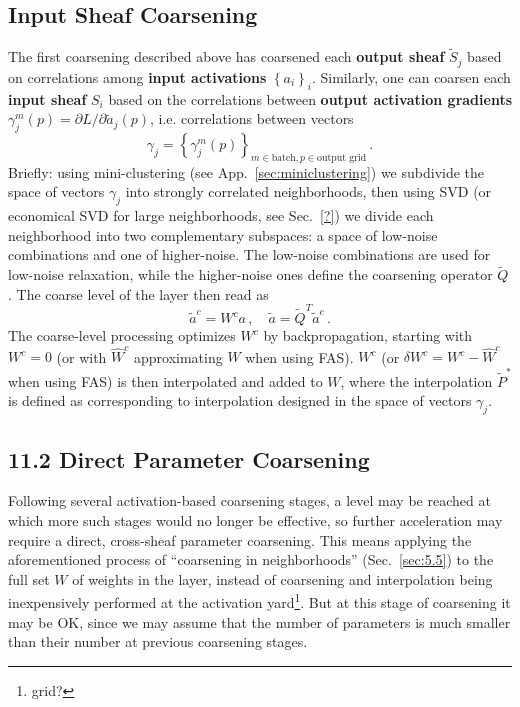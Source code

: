 \documentclass{article} %
\begin{document}
\subsection{Input Sheaf Coarsening}
The first coarsening described above has coarsened each \textbf{output sheaf} $\tilde{S}_j$ based on correlations among \textbf{input activations} $\left\{a_i\right\}_i$. Similarly, one can coarsen each \textbf{input sheaf} $S_i$ based on the correlations between \textbf{output activation gradients}
$\gamma^m_j(p) = \partial L/\partial \tilde{a}_j(p)$, i.e. correlations between vectors
$$
\gamma_j = \left\{ \gamma^m_j(p) \right\}_{m \in \text{batch}, p \in \text{output grid}}\,.
$$
Briefly: using mini-clustering (see App.~\ref{sec:miniclustering}) we subdivide the space of vectors $\gamma_j$ into strongly correlated neighborhoods, then using SVD (or economical SVD for large neighborhoods, see Sec.~\ref{?}) we divide each neighborhood into two complementary subspaces: a space of low-noise combinations and one of higher-noise. The low-noise combinations are used for low-noise relaxation, while the higher-noise ones define the coarsening operator $\tilde{Q}$. The coarse level of the layer then read as
\begin{equation}
    \tilde{a}^c = W^c a\,,\quad \tilde{a} = \tilde{Q}^T \tilde{a}^c\,.
    \label{11.1}
\end{equation}
The coarse-level processing optimizes $W^c$ by backpropagation, starting with $W^c = 0$ (or with $\hat{W}^c$ approximating $W$ when using FAS). $W^c$ (or $\delta W^c = W^c - \hat{W}^c$ when using FAS) is then interpolated and added to $W$, where the interpolation $\tilde{P}^*$ is defined as corresponding to interpolation designed in the space of vectors $\gamma_j$.

\subsection{11.2 Direct Parameter Coarsening}
\label{sec:direct_coarsening}
Following several activation-based coarsening stages, a level may be reached at which more such stages would no longer be effective, so further acceleration may require a direct, cross-sheaf parameter coarsening. This means applying the aforementioned process of ``coarsening in neighborhoods'' (Sec.~\ref{sec:5.5}) to the full set $W$ of weights in the layer, instead of coarsening and interpolation being inexpensively performed at the activation yard\footnote{grid?}. But at this stage of coarsening it may be OK, since we may assume that the number of parameters is much smaller than their number at previous coarsening stages.
\end{document}
